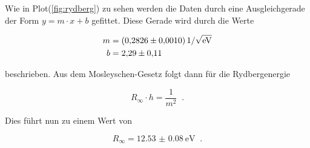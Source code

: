           \noindent Wie in Plot(\ref{fig:rydberg}) zu sehen werden die Daten durch eine Ausgleichgerade der Form $y = m \cdot x + b$ gefittet.
          Diese Gerade wird durch die Werte

          \begin{align*}
            m &= \SI{0.2826 \pm 0.0010}{1\per\sqrt{\electronvolt}}\\
            b &= \num{2.29 \pm 0.11}
          \end{align*}

          \noindent beschrieben. Aus dem Mosleyschen-Gesetz folgt dann für die Rydbergenergie 

          \begin{equation*}
            R_\infty \cdot h = \frac{1}{m^2} \; \; \text{.}
          \end{equation*}
          
          \noindent Dies führt nun zu einem Wert von 

          \begin{equation*}
            R_{\infty} = \SI{12.53(8)}{\electronvolt} \; \; \text{.}
          \end{equation*}

      

            
            
            

           

    



        


